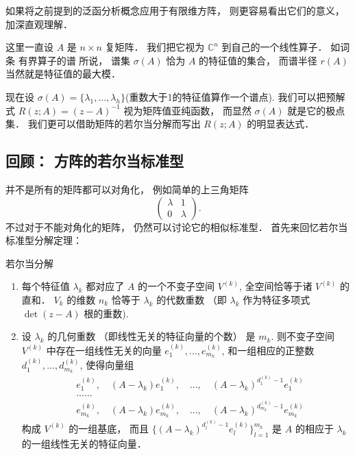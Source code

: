 

如果将之前提到的泛函分析概念应用于有限维方阵， 则更容易看出它们的意义， 加深直观理解． 

这里一直设 $A$ 是 $n\times n$ 复矩阵． 我们把它视为 $\mathbb{C}^n$ 到自己的一个线性算子． 如词条 有界算子的谱 所说， 谱集 $\sigma(A)$ 恰为 $A$ 的特征值的集合， 而谱半径 $r(A)$ 当然就是特征值的最大模． 

现在设 $\sigma(A)=\{\lambda_1,...,\lambda_h\}$(重数大于1的特征值算作一个谱点). 我们可以把预解式 $R(z;A)=(z-A)^{-1}$ 视为矩阵值亚纯函数， 而显然 $\sigma(A)$ 就是它的极点集． 我们更可以借助矩阵的若尔当分解而写出 $R(z;A)$ 的明显表达式． 

\subsection{回顾： 方阵的若尔当标准型}
并不是所有的矩阵都可以对角化， 例如简单的上三角矩阵
$$
\left(
\begin{matrix}
\lambda & 1 \\
0 & \lambda
\end{matrix}
\right).
$$
不过对于不能对角化的矩阵， 仍然可以讨论它的相似标准型． 首先来回忆若尔当标准型分解定理：

\begin{theorem}{若尔当分解}
\begin{enumerate}
\item 每个特征值 $\lambda_k$ 都对应了 $A$ 的一个不变子空间 $V^{(k)}$, 全空间恰等于诸 $V^{(k)}$ 的直和． $V_k$ 的维数 $n_k$ 恰等于 $\lambda_k$ 的代数重数 （即 $\lambda_k$ 作为特征多项式 $\det(z-A)$ 根的重数).
\item 设 $\lambda_k$ 的几何重数 （即线性无关的特征向量的个数） 是 $m_k$. 则不变子空间 $V^{(k)}$ 中存在一组线性无关的向量 $e^{(k)}_1,...,e^{(k)}_{m_k}$, 和一组相应的正整数 $d^{(k)}_1,...,d^{(k)}_{m_k}$, 使得向量组
$$
\begin{aligned}
&e^{(k)}_1,\quad(A-\lambda_k)e^{(k)}_1,\quad...,\quad(A-\lambda_k)^{d^{(k)}_1-1}e^{(k)}_1\\
&......\\
&e^{(k)}_{m_k},\quad(A-\lambda_k)e^{(k)}_{m_k},\quad...,\quad(A-\lambda_k)^{d^{(k)}_{m_k}-1}e^{(k)}_{m_k}
\end{aligned}
$$
构成 $V^{(k)}$ 的一组基底， 而且 $\{(A-\lambda_k)^{d^{(k)}_l-1}e^{(k)}_l\}_{l=1}^{m_k}$ 是 $A$ 的相应于 $\lambda_k$ 的一组线性无关的特征向量．
\end{enumerate}
\end{theorem}

